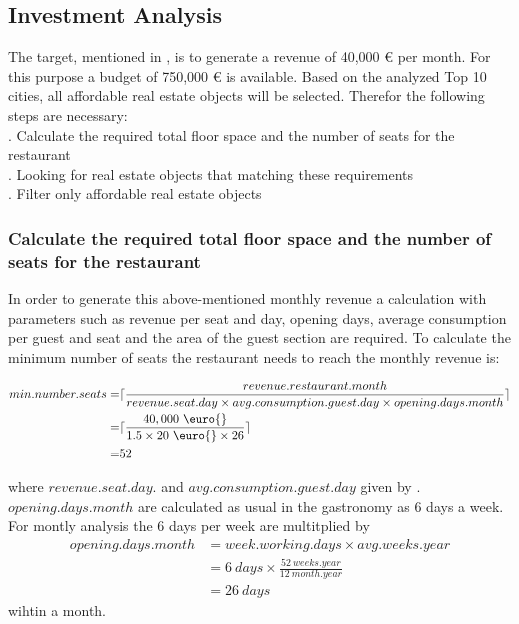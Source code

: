 \subsection{Investment Analysis}
\label{subsec:moneten}
The target, mentioned in , is to generate a revenue of 40,000 \euro{} per month. For this purpose
 a budget of 750,000 \euro{} is available. Based on the analyzed Top 10 cities, all affordable real estate objects will be
 selected. Therefor the following steps are necessary: \\
. Calculate the required total floor space and the number of seats for the restaurant \\
. Looking for real estate objects that matching these requirements \\
. Filter only affordable real estate objects \\

\subsubsection{Calculate the required total floor space and the number of seats for the restaurant}
In order to generate this above-mentioned monthly revenue a calculation with parameters such as revenue per seat and day,
 opening days, average consumption per guest and seat and the area of the guest section are required. To calculate the
 minimum number of seats the restaurant needs to reach the monthly revenue is:
\begin{center}
\begin{equation}
\begin{aligned}
	min.number.seats =&\lceil\frac{revenue.restaurant.month}{revenue.seat.day \times avg.consumption.guest.day \times opening.days.month}\rceil \\
	=&\lceil\frac{40,000 \ \text{\euro{}} }{1.5 \times 20 \ \text{\euro{}} \times 26}\rceil \\
	=&52
\end{aligned}
\label{eq:number_seats_benchmark}
\end{equation}
\end{center}

where $revenue.seat.day.$ and $avg.consumption.guest.day$ given by \cite{BenchmarkGastronomie}. $opening.days.month$
 are calculated as usual in the gastronomy as 6 days a week. For montly analysis the 6 days per week are multitplied by
\begin{equation}
    \begin{aligned}
        opening.days.month & = week.working.days \times avg.weeks.year \\
        & = 6 \ days \times \frac{52 \ weeks.year}{12 \ month.year} \\
        & = 26 \ days
    \end{aligned}
    \label{eq:opening_days}
\end{equation}
wihtin a month.


